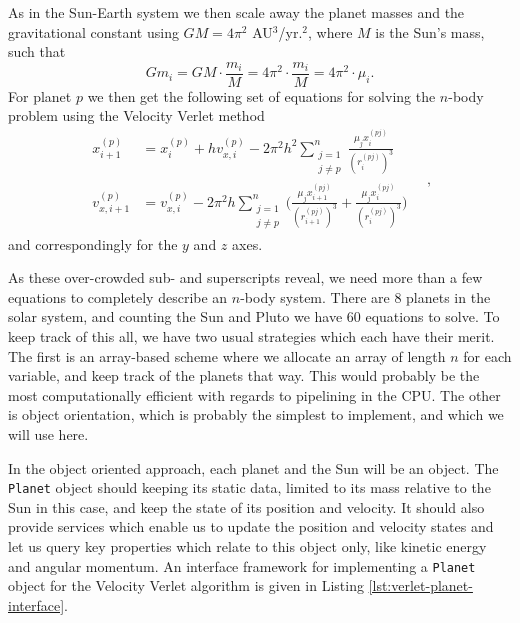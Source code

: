 \documentclass[]{article}
\begin{document}
As in the Sun-Earth system we then scale away the planet masses and the gravitational constant using $GM = 4 \pi^2$ AU$^3$/yr.$^2$, where $M$ is the Sun's mass, such that
\begin{equation}
	Gm_i = GM \cdot \frac{m_i}{M} = 4\pi^2 \cdot \frac{m_i}{M} = 4\pi^2 \cdot \mu_i.
\end{equation}
For planet $p$ we then get the following set of equations for solving the $n$-body problem using the Velocity Verlet method 
\begin{equation} \label{verlet-n}
\begin{aligned}
	x_{i+1}^{(p)} &= x_i^{(p)} + hv_{x,i}^{(p)} - 2\pi^2h^2 \sum_{\substack{j=1  \\ j \neq p}}^{n} \frac{\mu_j x_i^{(pj)}}{(r_i^{(pj)})^3} \\
	v_{x,i+1}^{(p)} &= v_{x,i}^{(p)} - 2\pi^2h \sum_{\substack{j=1  \\ j \neq p}}^{n} \bigg(\frac{\mu_j x_{i+1}^{(pj)}}{(r_{i+1}^{(pj)})^3} + \frac{\mu_j x_i^{(pj)}}{(r_i^{(pj)})^3} \bigg)	
\end{aligned} \quad ,
\end{equation}
and correspondingly for the $y$ and $z$ axes.

As these over-crowded sub- and superscripts reveal, we need more than a few equations to completely describe an $n$-body system. There are 8 planets in the solar system, and counting the Sun and Pluto we have 60 equations to solve. To keep track of this all, we have two usual strategies which each have their merit. The first is an array-based scheme where we allocate an array of length $n$ for each variable, and keep track of the planets that way. This would probably be the most computationally efficient with regards to pipelining in the CPU. The other is object orientation, which is probably the simplest to implement, and which we will use here.

In the object oriented approach, each planet and the Sun will be an object. The \lstinline|Planet| object should keeping its static data, limited to its mass relative to the Sun in this case, and keep the state of its position and velocity. It should also provide services which enable us to update the position and velocity states and let us query key properties which relate to this object only, like kinetic energy and angular momentum. An interface framework for implementing a \lstinline|Planet| object for the Velocity Verlet algorithm is given in Listing \ref{lst:verlet-planet-interface}.
\end{document}
